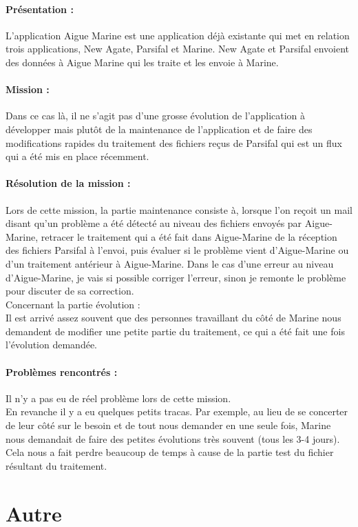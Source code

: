 \documentclass[a4paper,twoside,12pt]{report}
\begin{document}
\paragraph {Présentation :} 
L'application Aigue Marine est une application déjà existante qui met en relation trois applications, New Agate, Parsifal et Marine. New Agate et Parsifal envoient des données à Aigue Marine qui les traite et les envoie à Marine.\\
\paragraph {Mission :}
Dans ce cas là, il ne s'agit pas d'une grosse évolution de l'application à développer mais plutôt de la maintenance de l'application et de faire des modifications rapides du traitement des fichiers reçus de Parsifal qui est un flux qui a été mis en place récemment.
\paragraph {Résolution de la mission :}
Lors de cette mission, la partie maintenance consiste à, lorsque l'on reçoit un mail disant qu'un problème a été détecté au niveau des fichiers envoyés par Aigue-Marine, retracer le traitement qui a été fait dans Aigue-Marine de la réception des fichiers Parsifal à l'envoi, puis évaluer si le problème vient d'Aigue-Marine ou d'un traitement antérieur à Aigue-Marine. Dans le cas d'une erreur au niveau d'Aigue-Marine, je vais si possible corriger l'erreur, sinon je remonte le problème pour discuter de sa correction.\\
Concernant la partie évolution :\\
Il est arrivé assez souvent que des personnes travaillant du côté de Marine nous demandent de modifier une petite partie du traitement, ce qui a été fait une fois l'évolution demandée. 
\paragraph {Problèmes rencontrés :}
Il n'y a pas eu de réel problème lors de cette mission.\\
En revanche il y a eu quelques petits tracas. Par exemple, au lieu de se concerter de leur côté sur le besoin et de tout nous demander en une seule fois, Marine nous demandait de faire des petites évolutions très souvent (tous les 3-4 jours). Cela nous a fait perdre beaucoup de temps à cause de la partie test du fichier résultant du traitement.
\newpage
\section{Autre}
\vspace{1cm}
\end{document}
